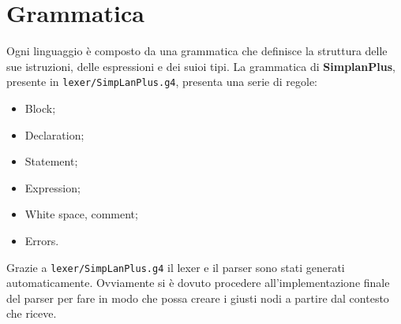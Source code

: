 \documentclass[../main]{subfiles}
\begin{document}
\section{Grammatica}
Ogni linguaggio è composto da una grammatica che definisce la struttura delle sue istruzioni, delle espressioni e dei suioi tipi.
La grammatica di \textbf{SimplanPlus}, presente in \verb|lexer/SimpLanPlus.g4|, presenta una serie di regole:
\begin{itemize}
    \item Block;
    \item Declaration;
    \item Statement;
    \item Expression;
    \item White space, comment;
    \item Errors.
\end{itemize}
Grazie a \verb|lexer/SimpLanPlus.g4| il lexer e il parser sono stati generati automaticamente. Ovviamente si è dovuto procedere all'implementazione finale
del parser per fare in modo che possa creare i giusti nodi a partire dal contesto che riceve.






\end{document}
